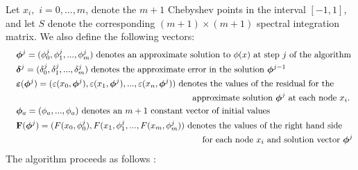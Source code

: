 \documentclass{sfuthesis}
\begin{document}
Let $x_i,$ $i=0,...,m$, denote the $m+1$ Chebyshev points in the interval $[-1,1]$, and let $S$ denote the corresponding $(m+1)\times(m+1)$ spectral integration matrix. 
We also define the following vectors: 
\begin{align*}
	&\hspace{0.4cm} \bm{\phi}^{j}=(\phi_0^j, \phi_1^j, ..., \phi_m^j) \text{ denotes an approximate solution to $\phi(x)$ at step $j$ of the algorithm }\\
	&\hspace{0.4cm} \bm{\delta}^j=(\delta_0^j, \delta_1^j, ..., \delta_m^j) \text{ denotes the approximate error in the solution $\bm{\phi}^{j-1}$ } \\
	&\hspace{0.4cm} \bm{\varepsilon}(\bm{\phi}^j)=(\varepsilon(x_0, \bm{\phi}^j), \varepsilon(x_1, \bm{\phi}^j), ..., \varepsilon(x_n, \bm{\phi}^j)) \text{ denotes the values of the residual for the }\\ &\text{\hspace{7.4cm} approximate solution $\bm{\phi}^j$ at each node $x_i$.} \\
	& \hspace{0.4cm} \bm{\phi}_a=(\phi_a, ..., \phi_a) \text{ denotes an $m+1$ constant vector of initial values}\\
	& \hspace{0.4cm}\mathbf{F}(\bm{\phi}^j)=(F(x_0, \phi_0^j), F(x_1, \phi_1^j, ..., F(x_m, \phi_m^j)) \text{ denotes the values of the right hand side }\\
	& \text{\hspace{7.8cm} for each node $x_i$ and solution vector $\bm{\phi}^j$}
\end{align*}
The algorithm proceeds as follows \cite{Dutt2000}: 
\end{document}
